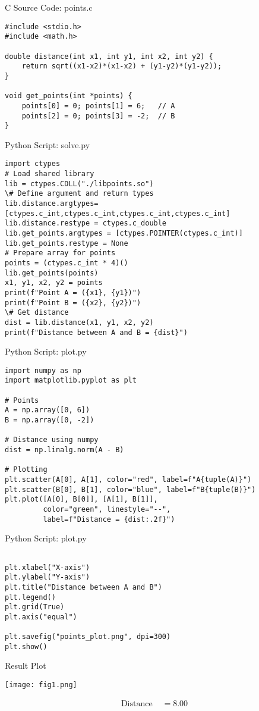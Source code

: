 \documentclass{beamer}
\numberwithin{equation}{section}
\theoremstyle{remark}
\begin{document}
\begin{frame}[fragile]{C Source Code: points.c}
\begin{verbatim}
#include <stdio.h>
#include <math.h>

double distance(int x1, int y1, int x2, int y2) {
    return sqrt((x1-x2)*(x1-x2) + (y1-y2)*(y1-y2));
}

void get_points(int *points) {
    points[0] = 0; points[1] = 6;   // A
    points[2] = 0; points[3] = -2;  // B
}
\end{verbatim}
\end{frame}

\begin{frame}[fragile]{Python Script: solve.py}
\begin{verbatim}
import ctypes
# Load shared library
lib = ctypes.CDLL("./libpoints.so")
\# Define argument and return types
lib.distance.argtypes=[ctypes.c_int,ctypes.c_int,ctypes.c_int,ctypes.c_int]
lib.distance.restype = ctypes.c_double
lib.get_points.argtypes = [ctypes.POINTER(ctypes.c_int)]
lib.get_points.restype = None
# Prepare array for points
points = (ctypes.c_int * 4)()
lib.get_points(points)
x1, y1, x2, y2 = points
print(f"Point A = ({x1}, {y1})")
print(f"Point B = ({x2}, {y2})")
\# Get distance
dist = lib.distance(x1, y1, x2, y2)
print(f"Distance between A and B = {dist}")
\end{verbatim}
\end{frame}

\begin{frame}[fragile]{Python Script: plot.py}
\begin{verbatim}
import numpy as np
import matplotlib.pyplot as plt

# Points
A = np.array([0, 6])
B = np.array([0, -2])

# Distance using numpy
dist = np.linalg.norm(A - B)

# Plotting
plt.scatter(A[0], A[1], color="red", label=f"A{tuple(A)}")
plt.scatter(B[0], B[1], color="blue", label=f"B{tuple(B)}")
plt.plot([A[0], B[0]], [A[1], B[1]],
         color="green", linestyle="--",
         label=f"Distance = {dist:.2f}")
\end{verbatim}
\end{frame}
\begin{frame}[fragile]{Python Script: plot.py}
\begin{verbatim}

plt.xlabel("X-axis")
plt.ylabel("Y-axis")
plt.title("Distance between A and B")
plt.legend()
plt.grid(True)
plt.axis("equal")

plt.savefig("points_plot.png", dpi=300)
plt.show()
\end{verbatim}
\end{frame}

\begin{frame}{Result Plot}
  \begin{center}
    \texttt{[image: fig1.png]}
  \end{center}
  \begin{align}
    \text{Distance } &= 8.00
  \end{align}
\end{frame}
\end{document}
